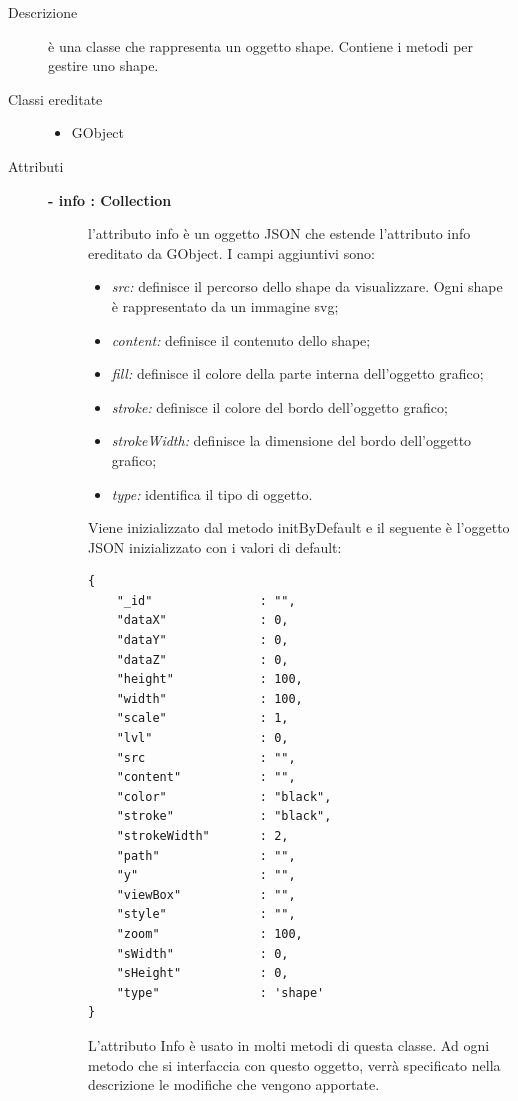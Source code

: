 \begin{description}
\item[Descrizione] \hfill
	è una classe che rappresenta un oggetto shape. Contiene i metodi per gestire uno shape.
	
\item[Classi ereditate] \hfill
	\begin{itemize}
		\item GObject
	\end{itemize}
	
\item[Attributi] \hfill
	\begin{description}
		\item[\textbf{- info : Collection			}] \hfill
			l'attributo info è un oggetto JSON che estende l'attributo info ereditato da GObject. I campi aggiuntivi sono:
	\begin{itemize}
		\item \textit{src:} definisce il percorso dello shape da visualizzare. Ogni shape è rappresentato da un immagine svg;
		\item \textit{content:} definisce il contenuto dello shape;		
		\item \textit{fill:} definisce il colore della parte interna dell'oggetto grafico; %
        \item \textit{stroke:} definisce il colore del bordo dell'oggetto grafico; %
        \item \textit{strokeWidth:} definisce la dimensione del bordo dell'oggetto grafico; %
		\item \textit{type:} identifica il tipo di oggetto.		
	\end{itemize}
	Viene inizializzato dal metodo initByDefault e il seguente è l'oggetto JSON inizializzato con i valori di default:
\begin{lstlisting}
{
    "_id"               : "",    
    "dataX"             : 0,
    "dataY"             : 0,
    "dataZ"             : 0,
    "height"            : 100,
    "width"             : 100,
    "scale"             : 1,
    "lvl"               : 0,
    "src                : "",
    "content"           : "",
    "color"             : "black",
    "stroke"            : "black",
    "strokeWidth"       : 2,
    "path"              : "",
    "y"                 : "",
    "viewBox"           : "",
    "style"             : "",
    "zoom"              : 100,
    "sWidth"            : 0,
    "sHeight"           : 0,
    "type"              : 'shape'
}
\end{lstlisting}					
                 L'attributo Info è usato in molti metodi di questa classe. Ad ogni metodo che si interfaccia con questo oggetto, verrà specificato nella descrizione le modifiche che vengono apportate. 	
	\end{description}
	

\end{description}

